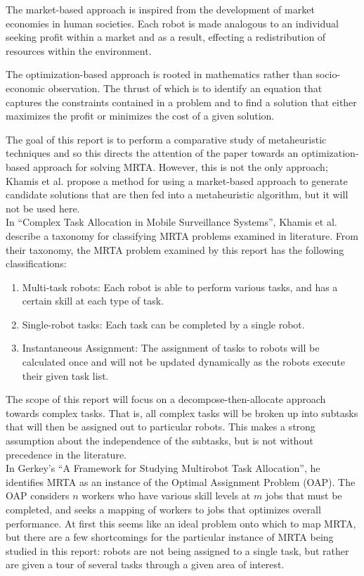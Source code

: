 \documentclass[a4paper]{article}
\begin{document}
The market-based approach is inspired from the development of market economies in human societies.
Each robot is made analogous to an individual seeking profit within a market and as a result, effecting a redistribution of resources within the environment.

The optimization-based approach is rooted in mathematics rather than socio-economic observation.
The thrust of which is to identify an equation that captures the constraints contained in a problem and to find a solution that either maximizes the profit or minimizes the cost of a given solution.

The goal of this report is to perform a comparative study of metaheuristic techniques and so this directs the attention of the paper towards an optimization-based approach for solving MRTA. However, this is not the only approach; Khamis et al.\cite{Khamis} propose a method for using a market-based approach to generate candidate solutions that are then fed into a metaheuristic algorithm, but it will not be used here.\\

In ``Complex Task Allocation in Mobile Surveillance Systems''\cite{Khamis}, Khamis et al. describe a taxonomy for classifying MRTA problems examined in literature. From their taxonomy, the MRTA problem examined by this report has the following classifications:

\begin{enumerate}
\item Multi-task robots: Each robot is able to perform various tasks, and has a certain skill at each type of task.
\item Single-robot tasks: Each task can be completed by a single robot.
\item Instantaneous Assignment: The assignment of tasks to robots will be calculated once and will not be updated dynamically as the robots execute their given task list.
\end{enumerate}

The scope of this report will focus on a decompose-then-allocate approach towards complex tasks. That is, all complex tasks will be broken up into subtasks that will then be assigned out to particular robots. This makes a strong assumption about the independence of the subtasks, but is not without precedence in the literature.\cite{Khamis}\\

In Gerkey's ``A Framework for Studying Multirobot Task Allocation''\cite{Gerkey}, he identifies MRTA as an instance of the Optimal Assignment Problem (OAP). The OAP considers $n$ workers who have various skill levels at $m$ jobs that must be completed, and seeks a mapping of workers to jobs that optimizes overall performance. At first this seems like an ideal problem onto which to map MRTA, but there are a few shortcomings for the particular instance of MRTA being studied in this report: robots are not being assigned to a single task, but rather are given a tour of several tasks through a given area of interest.
\end{document}
